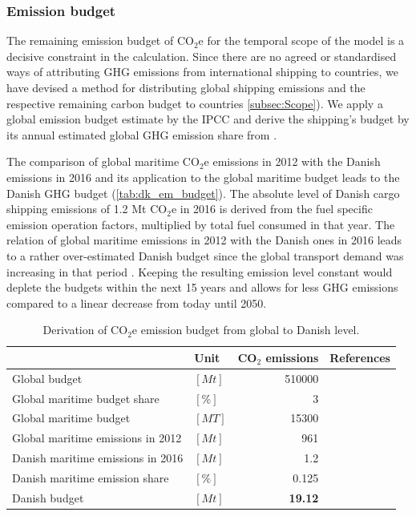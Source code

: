 \documentclass[article]{elsarticle}
\begin{document}
\subsubsection{Emission budget}
\label{subsec:em_budget}
The remaining emission budget of CO$_2$e for the temporal scope of the model is a decisive constraint in the calculation. Since there are no agreed or standardised ways of attributing GHG emissions from international shipping to countries, we have devised a method for distributing global shipping emissions and the respective remaining carbon budget to countries \ref{subsec:Scope}). We apply a global emission budget estimate by the IPCC \cite[Tab.~SPM.3, RCP2.6]{IPCC2013} and derive the shipping's budget by its annual estimated global GHG emission share from \citet{Olmer2017}.

The comparison of global maritime CO$_2$e emissions in 2012 with the Danish emissions in 2016 and its application to the global maritime budget leads to the Danish GHG budget (\autoref{tab:dk_em_budget}). The absolute level of Danish cargo shipping emissions of 1.2 Mt CO$_2$e in 2016 is derived from the fuel specific emission operation factors, multiplied by total fuel consumed in that year. The relation of global maritime emissions in 2012 with the Danish ones in 2016 leads to a rather over-estimated Danish budget since the global transport demand was increasing in that period \cite[Tab.~3,~p.~5]{UNCTAD2017}. Keeping the resulting emission level constant would deplete the budgets within the next 15 years and allows for less GHG emissions compared to a linear decrease from today until 2050.
\begin{table}[htb]
    \centering
    \begin{tabular}{llrr}
        \toprule
         & Unit & CO$_2$ emissions & References \\
         \midrule
         Global budget & $\left[Mt\right]$ & 510000 & \cite{IPCC2013} \\
         Global maritime budget share & $\left[\%\right]$ & 3 & \cite{Olmer2017} \\
         Global maritime budget & $\left[MT\right]$ & 15300 &\\[1.5ex]
         Global maritime emissions in 2012 & $\left[Mt\right]$ & 961 & \cite{Smith2014} \\
         Danish maritime emissions in 2016 & $\left[Mt\right]$ & 1.2 & \cite{Kristensen2012,Eurostat2018,Wisdom2017} \\
         Danish maritime emission share & $\left[\%\right]$ & 0.125 &\\[1.5ex]
         Danish budget & $\left[Mt\right]$ & \textbf{19.12} & \\
         \bottomrule
    \end{tabular}
    \caption{Derivation of CO$_2$e emission budget from global to Danish level.}
    \label{tab:dk_em_budget}
\end{table}
\end{document}
